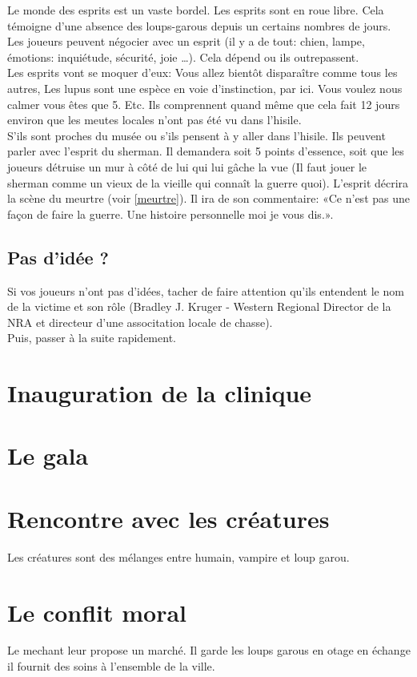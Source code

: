 \documentclass[oneside,12pt]{book}
\begin{document}
\begin{flushleft}
Le monde des esprits est un vaste bordel. Les esprits sont en roue libre. Cela témoigne d’une absence des loups-garous depuis un certains nombres de jours.\\
Les joueurs peuvent négocier avec un esprit (il y a de tout: chien, lampe, émotions: inquiétude, sécurité, joie …). Cela dépend ou ils outrepassent.\\
Les esprits vont se moquer d’eux: Vous allez bientôt disparaître comme tous les autres, Les lupus sont une espèce en voie d’instinction, par ici. Vous voulez nous calmer vous êtes que 5. Etc.
Ils comprennent quand même que cela fait 12 jours environ que les meutes locales n’ont pas été vu dans l’hisile.\\
S’ils sont proches du musée ou s’ils pensent à y aller dans l’hisile. Ils peuvent parler avec l’esprit du sherman. Il demandera soit 5 points d’essence, soit que les joueurs détruise un mur à côté de lui qui lui gâche la vue (Il faut jouer le sherman comme un vieux de la vieille qui connaît la guerre quoi). L’esprit décrira la scène du meurtre (voir \ref{meurtre}). Il ira de son commentaire: «Ce n’est pas une façon de faire la guerre. Une histoire personnelle moi je vous dis.».\\


\subsection{Pas d’idée ?}
Si vos joueurs n’ont pas d’idées, tacher de faire attention qu’ils entendent le nom de la victime et son rôle (Bradley J. Kruger - Western Regional Director de la NRA et directeur d’une associtation locale de chasse).\\
Puis, passer à la suite rapidement.


\section{Inauguration de la clinique}

\section{Le gala}


\section{Rencontre avec les créatures}

Les créatures sont des mélanges entre humain, vampire et loup garou. 

\section{Le conflit moral}

Le mechant leur propose un marché. 
Il garde les loups garous en otage en échange il fournit des soins à l'ensemble de la ville.


\end{flushleft}
\end{document}
